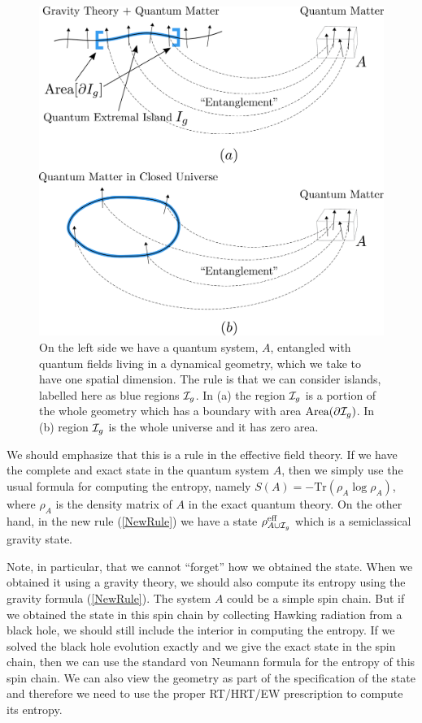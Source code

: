 \documentclass[11pt]{article}
\def\nref#1{(\ref{#1})}
\begin{document}
 
\begin{figure}[ht]
    \begin{center}
    \includegraphics[scale=.17]{Figures/Pockets.pdf}
    \end{center}
    \caption{On the left side we have a quantum system, $A$, entangled with quantum fields living in a dynamical geometry, which we take to have one spatial dimension.  The rule is that we can consider islands, labelled here as blue regions ${\cal I}_g$. In (a) the region ${\cal I}_g$ is a portion of the whole geometry which has a boundary with area $\text{Area}(\partial {\cal I}_g)$. In (b) region ${\cal I}_g$ is the whole universe and it has zero area.}
    \label{islands}
\end{figure}

We should emphasize that this is a rule in the effective field theory. 
If we have the complete and exact state in the quantum system $A$, then we simply use the usual formula for computing the entropy, namely $S(A) = - \text{Tr}(\rho_A \log \rho_A)$, where $\rho_A$ is the density matrix of $A$ in the exact quantum theory.
On the other hand, in the new rule \nref{NewRule} we have a state $\rho^{\rm eff}_{A \cup {{\cal I}_g}}$ which is a semiclassical gravity state.

Note,  in  particular, that we cannot ``forget'' how we obtained the state. 
When we obtained it using a gravity theory, we should also compute its entropy using the gravity formula \nref{NewRule}. 
The system $A$ could be a simple spin chain. 
But if we obtained the state in this spin chain by collecting Hawking radiation from a black hole, we should still include the interior in computing the entropy. 
If we solved the black hole evolution exactly and we give the exact state in the spin chain, then we can use the standard von Neumann formula for the entropy of this spin chain. 
We can also view the geometry as part of the specification of the state and therefore we need to use the proper RT/HRT/EW prescription to compute its entropy. 
\end{document}
